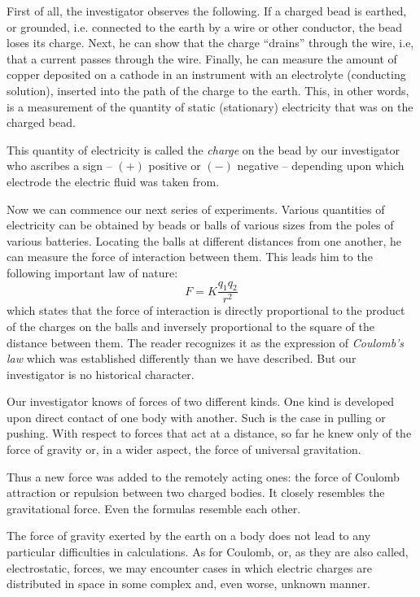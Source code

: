 First of all, the investigator observes the following. If a charged bead is earthed, or grounded, i.e. connected to the earth by a wire or other conductor, the bead loses its charge. Next, he can show that the charge ``drains'' through the wire, i.e, that a current passes through the wire. Finally, he can measure the amount of copper deposited on a cathode in an instrument with an electrolyte (conducting solution), inserted into the path of the charge to the earth. This, in other words, is a measurement of the quantity of static (stationary) electricity that was on the charged bead.

This quantity of electricity is called the \emph{charge} on the bead by our investigator who ascribes a sign -- $(+)$ positive or $(-)$ negative -- depending upon which electrode the electric fluid was taken from.

Now we can commence our next series of experiments. Various quantities of electricity can be obtained by beads or balls of various sizes from the poles of various batteries. Locating the balls at different distances from one another, he can measure the force of interaction between them. This leads him to the following important law of nature:
\begin{equation*}%
F = K \frac{q_{1}q_{2}}{r^{2}}
\end{equation*}
which states that the force of interaction is directly proportional to the product of the charges on the balls and inversely proportional to the square of the distance between them. The reader recognizes it as the expression of \emph{Coulomb's law} which was established differently than we have described. But our investigator is no historical character.

Our investigator knows of forces of two different kinds. One kind is developed upon direct contact of one body with another. Such is the case in pulling or pushing. With respect to forces that act at a distance, so far he knew only of the force of gravity or, in a wider aspect, the force of universal gravitation.

Thus a new force was added to the remotely acting ones: the force of Coulomb attraction or repulsion between two charged bodies. It closely resembles the gravitational force. Even the formulas resemble each other.

The force of gravity exerted by the earth on a body does not lead to any particular difficulties in calculations. As for Coulomb, or, as they are also called, electrostatic, forces, we may encounter cases in which electric charges are distributed in space in some complex and, even worse, unknown manner.

